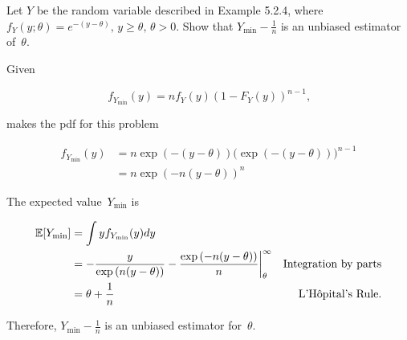 \begin{problem}
   Let $Y$ be the random variable described in Example 5.2.4, where ${f_{Y} (y; \theta) = e^{-(y-\theta)}\text{, }y \geq \theta\text{, }\theta > 0}$. Show that ${Y_{\min} - \frac{1}{n}}$ is an unbiased estimator of~$\theta$.
\end{problem}

Given

\begin{equation}
  f_{Y_{\min}}(y) = n f_{Y}(y) (1 - F_{Y}(y))^{n-1}\text{,}
\end{equation}

\noindent
makes the pdf for this problem

\begin{align*}
  f_{Y_{\min}}(y) &= n\exp\left(-(y-\theta)\right) \bigg(\exp\left(-(y-\theta)\right)\bigg)^{n-1} \\
                  &= n \exp\left(-n(y-\theta)\right)^{n}
\end{align*}

The expected value~$Y_{\min}$ is

\begin{align*}
  \mathbb{E}\lbrack Y_{\min}\rbrack &= \int y f_{Y_{\min}}(y) dy \\
                    &= -\frac{y}{\exp\left(n(y-\theta)\right)} - \frac{\exp\left(-n(y-\theta)\right)}{n} \bigg\vert_{\theta}^{\infty} & \text{Integration by parts} \\
                    &= \theta + \frac{1}{n} & \text{L'H\^{o}pital's Rule} \text{.}
\end{align*}

\noindent
Therefore, $\boxed{Y_{\min} - \frac{1}{n}}$ is an unbiased estimator for~$\theta$.
